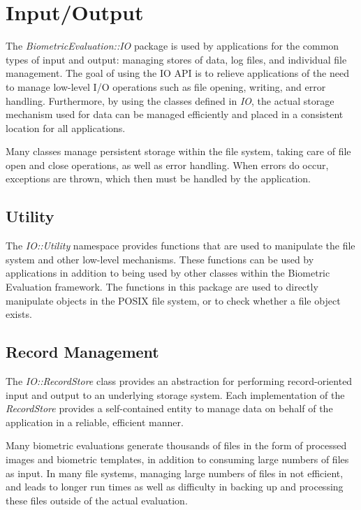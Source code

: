 %
%
\chapter{Input/Output}
\label{chp-io}

The {\em BiometricEvaluation::IO} package is used
by applications for the common types of input and output: managing stores of
data, log files, and individual file management. The goal of using the IO API 
is to relieve applications of the need to manage low-level I/O operations such
as file opening, writing, and error handling. Furthermore, by using the classes
defined in {\em IO}, the actual storage mechanism used for data can be managed 
efficiently and placed in a consistent location for all applications.

Many classes manage persistent storage within the file system,
taking care of file open and close operations, as well as error handling. When
errors do occur, exceptions are thrown, which then must be handled by the
application.

\section{Utility}

The {\em IO::Utility} namespace provides functions that are used to
manipulate the file system and other low-level mechanisms. These functions
can be used by applications in addition to being used by other classes 
within the Biometric Evaluation framework.
The functions in this package are used to directly manipulate objects in the
POSIX file system, or to check whether a file object exists.

\section{Record Management}

The {\em IO::RecordStore} class provides an abstraction for performing
record-oriented input and output to an underlying storage system. Each
implementation of the {\em RecordStore} provides a self-contained entity to
manage data on behalf of the application in a reliable, efficient manner.

Many biometric evaluations generate thousands of files in the form of processed
images and biometric templates, in addition to consuming large numbers of files
as input. In many file systems, managing large numbers of files in not
efficient, and leads to longer run times as well as difficulty in backing up
and processing these files outside of the actual evaluation.

